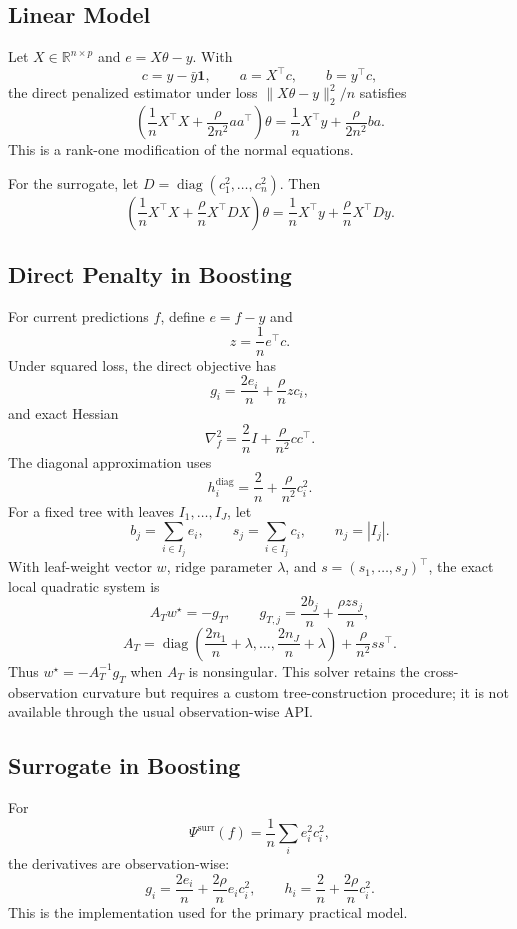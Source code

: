 \documentclass[10pt]{article}
\theoremstyle{definition}
\newcommand{\R}{\mathbb{R}}
\newcommand{\diag}{\operatorname{diag}}
\newcommand{\1}{\mathbf{1}}
\begin{document}
{{{}

\subsection{Linear Model}

Let $X\in\R^{n\times p}$ and $e=X\theta-y$. With
\[
c=y-\bar y\1,\qquad a=X^\top c,\qquad b=y^\top c,
\]
the direct penalized estimator under loss $\|X\theta-y\|_2^2/n$ satisfies
\[
\left(
\frac{1}{n}X^\top X+\frac{\rho}{2n^2}aa^\top
\right)\theta
=
\frac{1}{n}X^\top y+\frac{\rho}{2n^2}ba.
\]
This is a rank-one modification of the normal equations.

For the surrogate, let $D=\diag(c_1^2,\ldots,c_n^2)$. Then
\[
\left(
\frac{1}{n}X^\top X+\frac{\rho}{n}X^\top DX
\right)\theta
=
\frac{1}{n}X^\top y+\frac{\rho}{n}X^\top Dy.
\]

\subsection{Direct Penalty in Boosting}

For current predictions $f$, define $e=f-y$ and
\[
z=\frac{1}{n}e^\top c.
\]
Under squared loss, the direct objective has
\[
g_i=\frac{2e_i}{n}+\frac{\rho}{n}zc_i,
\]
and exact Hessian
\[
\nabla_f^2
=
\frac{2}{n}I+\frac{\rho}{n^2}cc^\top.
\]
The diagonal approximation uses
\[
h_i^{\mathrm{diag}}
=
\frac{2}{n}+\frac{\rho}{n^2}c_i^2.
\]
For a fixed tree with leaves $I_1,\ldots,I_J$, let
\[
b_j=\sum_{i\in I_j}e_i,
\qquad
s_j=\sum_{i\in I_j}c_i,
\qquad
n_j=|I_j|.
\]
With leaf-weight vector $w$, ridge parameter $\lambda$, and $s=(s_1,\ldots,s_J)^\top$, the exact local quadratic system is
\[
A_Tw^\star=-g_T,
\qquad
g_{T,j}=\frac{2b_j}{n}+\frac{\rho z s_j}{n},
\]
\[
A_T
=
\diag\!\left(\frac{2n_1}{n}+\lambda,\ldots,\frac{2n_J}{n}+\lambda\right)
+\frac{\rho}{n^2}ss^\top.
\]
Thus $w^\star=-A_T^{-1}g_T$ when $A_T$ is nonsingular. This solver retains the cross-observation curvature but requires a custom tree-construction procedure; it is not available through the usual observation-wise API.

\subsection{Surrogate in Boosting}

For
\[
\Psi^{\mathrm{surr}}(f)
=
\frac{1}{n}\sum_i e_i^2c_i^2,
\]
the derivatives are observation-wise:
\[
g_i=\frac{2e_i}{n}+\frac{2\rho}{n}e_ic_i^2,
\qquad
h_i=\frac{2}{n}+\frac{2\rho}{n}c_i^2.
\]
This is the implementation used for the primary practical model.

}}
\end{document}
